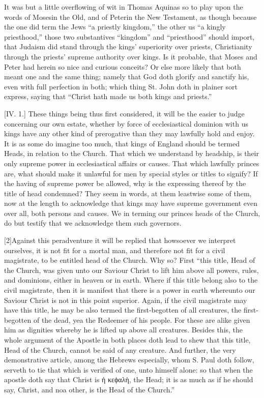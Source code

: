 It was but a little overflowing of wit in Thomas Aquinas so to play upon the words of Mosesin the Old, and of Peterin the New Testament, as though because the one did term the Jews “a priestly kingdom,” the other us “a kingly priesthood,” those two substantives “kingdom” and “priesthood” should import, that Judaism did stand through the kings’ superiority over priests, Christianity through the priests’ supreme authority over kings. Is it probable, that Moses and Peter had herein so nice and curious conceits? Or else more likely that both meant one and the same thing; namely that God doth glorify and sanctify his, even with full perfection in both; which thing St. John doth in plainer sort express, saying that “Christ hath made us both kings and priests.”


[IV. 1.] These things being thus first considered, it will be the easier to judge concerning our own estate, whether by force of ecclesiastical dominion with us kings have any other kind of prerogative than they may lawfully hold and enjoy. It is as some do imagine too much, that kings of England should be termed Heads, in relation to the Church.
That which we understand by headship, is their only supreme power in ecclesiastical affairs or causes. That which lawfully princes are, what should make it unlawful for men by special styles or titles to signify? If the having of supreme power be allowed, why is the expressing thereof by the title of head condemned? They seem in words, at them leastwise some of them, now at the length to acknowledge that kings may have supreme government even over all, both persons and causes. We in terming our princes heads of the Church, do but testify that we acknowledge them such governors.

[2]Against this peradventure it will be replied that  howsoever we interpret ourselves, it is not fit for a mortal man, and therefore not fit for a civil magistrate, to be entitled head of the Church. Why so? First “this title, Head of the Church, was given unto our Saviour Christ to lift him above all powers, rules, and dominions, either in heaven or in earth. Where if this title belong also to the civil magistrate, then it is manifest that there is a power in earth whereunto our Saviour Christ is not in this point superior. Again, if the civil magistrate may have this title, he may be also termed the first-begotten of all creatures, the first-begotten of the dead, yea the Redeemer of his people. For these are alike given him as dignities whereby he is lifted up above all creatures. Besides this, the whole argument of the Apostle in both places doth lead to shew that this title, Head of the Church, cannot be said of any creature. And further, the very demonstrative article, among the Hebrews especially, whom S. Paul doth follow, serveth to tie that which is verified of one, unto himself alone: so that when the apostle doth say that Christ is  ἡ κεϕαλὴ, the Head; it is as much as if he should say, Christ, and noa other, is the Head of the Church.”

